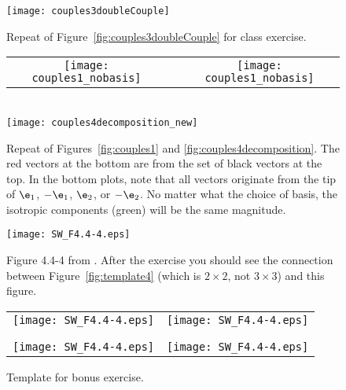 \documentclass[11pt,titlepage,fleqn]{article}
\begin{document}
\begin{figure}
\hspace{-1cm}
\texttt{[image: couples3doubleCouple]}
\caption{
Repeat of Figure~\ref{fig:couples3doubleCouple} for class exercise.
\label{fig:templateDC}
}
\end{figure}

\begin{figure}
\centering
\begin{tabular}{ccc}
\texttt{[image: couples1\_nobasis]}
& \hspace{1.4cm} &
\texttt{[image: couples1\_nobasis]}
\end{tabular}
\\
\makebox{\hspace{0.5cm}}
\texttt{[image: couples4decomposition\_new]}
\caption{
Repeat of Figures~\ref{fig:couples1} and \ref{fig:couples4decomposition}.
The red vectors at the bottom are from the set of black vectors at the top.
In the bottom plots, note that all vectors originate from the tip of $\e_1$, $-\e_1$, $\e_2$, or $-\e_2$.
No matter what the choice of basis, the isotropic components (green) will be the same magnitude.
\label{fig:decom}
}
\end{figure}


\begin{figure}
\centering
\texttt{[image: SW\_F4.4-4.eps]}
\caption{
Figure 4.4-4 from \citet{SteinWysession}.
After the exercise you should see the connection between Figure~\ref{fig:template4} (which is $2 \times 2$, not $3 \times 3$) and this figure.
\label{fig:SW}
}
\end{figure}

\begin{figure}
\hspace{-1cm}
\begin{tabular}{c|c}
\texttt{[image: SW\_F4.4-4.eps]} & \texttt{[image: SW\_F4.4-4.eps]} \\
& \\ \hline
& \\
\texttt{[image: SW\_F4.4-4.eps]} & \texttt{[image: SW\_F4.4-4.eps]} 
\end{tabular}
\caption{
Template for bonus exercise.
\label{fig:SWfour}
}
\end{figure}

\end{document}
